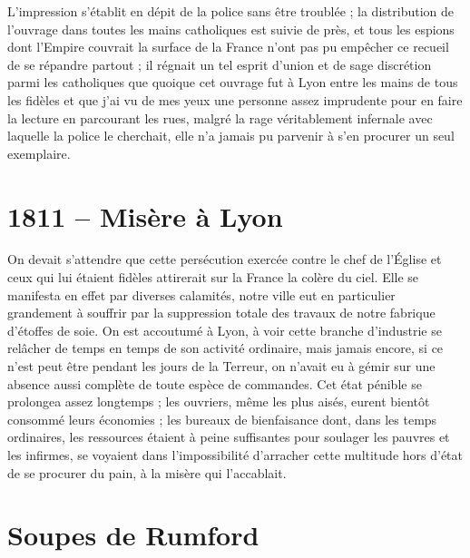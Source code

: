 \documentclass[11pt,a4paper]{report}
\begin{document}
L'impression s'établit en dépit de la police sans être troublée ; la distribution de l'ouvrage dans toutes les mains catholiques est suivie de près, et tous les espions dont l'Empire couvrait la surface de la France n'ont pas pu empêcher ce recueil de se répandre partout ; il régnait un tel esprit d'union et de sage discrétion parmi les catholiques que quoique cet ouvrage fut à Lyon entre les mains de tous les fidèles et que j'ai vu de mes yeux une personne assez imprudente pour en faire la lecture en parcourant les rues, malgré la rage véritablement infernale avec laquelle la police le cherchait, elle n'a jamais pu parvenir à s'en procurer un seul exemplaire.

\section*{1811 -- Misère à Lyon}

On devait s'attendre que cette persécution exercée contre le chef de l'Église et ceux qui lui étaient fidèles attirerait sur la France la colère du ciel. Elle se manifesta en effet par diverses calamités, notre ville eut en particulier grandement à souffrir par la suppression totale des travaux de notre fabrique d'étoffes de soie. On est accoutumé à Lyon, à voir cette branche d'industrie se relâcher de temps en temps de son activité ordinaire, mais jamais encore, si ce n'est peut être pendant les jours de la Terreur, on n'avait eu à gémir sur une absence aussi complète de toute espèce de commandes. Cet état pénible se prolongea assez longtemps ; les ouvriers, même les plus aisés, eurent bientôt consommé leurs économies ; les bureaux de bienfaisance dont, dans les temps ordinaires, les ressources étaient à peine suffisantes pour soulager les pauvres et les infirmes, se voyaient dans l'impossibilité d'arracher cette multitude hors d'état de se procurer du pain, à la misère qui l'accablait.

\section*{Soupes de Rumford}
\end{document}
